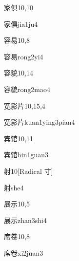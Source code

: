 \begin{entry}{家俱}{10,10}
  \begin{phonetics}{家俱}{jia1ju4}
  \end{phonetics}
\end{entry}

\begin{entry}{容易}{10,8}
  \begin{phonetics}{容易}{rong2yi4}
  \end{phonetics}
\end{entry}

\begin{entry}{容貌}{10,14}
  \begin{phonetics}{容貌}{rong2mao4}
  \end{phonetics}
\end{entry}

\begin{entry}{宽影片}{10,15,4}
  \begin{phonetics}{宽影片}{kuan1ying3pian4}
  \end{phonetics}
\end{entry}

\begin{entry}{宾馆}{10,11}
  \begin{phonetics}{宾馆}{bin1guan3}
  \end{phonetics}
\end{entry}

\begin{entry}{射}{10}[Radical 寸]
  \begin{phonetics}{射}{she4}
  \end{phonetics}
\end{entry}

\begin{entry}{展示}{10,5}
  \begin{phonetics}{展示}{zhan3shi4}
  \end{phonetics}
\end{entry}

\begin{entry}{席卷}{10,8}
  \begin{phonetics}{席卷}{xi2juan3}
  \end{phonetics}
\end{entry}

